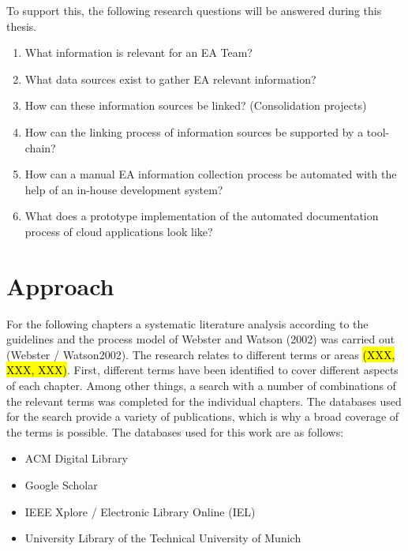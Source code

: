 To support this, the following research questions will be answered during this thesis.
\begin{enumerate}

    \item What information is relevant for an EA Team?

    \item What data sources exist to gather EA relevant information?

    \item How can these information sources be linked? (Consolidation projects)

    \item How can the linking process of information sources be supported by a tool-chain?

    \item How can a manual EA information collection process be automated with the help of an in-house development system?

    \item What does a prototype implementation of the automated documentation process of cloud applications look like?
\end{enumerate}

\section{Approach}
For the following chapters a systematic literature analysis according to the guidelines and the process model of Webster and Watson (2002) was carried out (Webster / Watson2002). The research relates to different terms or areas \hl{(XXX, XXX, XXX)}. First, different terms have been identified to cover different aspects of each chapter. Among other things, a search with a number of combinations of the relevant terms was completed for the individual chapters.
The databases used for the search provide a variety of publications, which is why a broad coverage of the terms is possible. The databases used for this work are as follows:

\begin{itemize}
    \item ACM Digital Library
    \item Google Scholar
    \item IEEE Xplore / Electronic Library Online (IEL)
    \item University Library of the Technical University of Munich
\end{itemize}

